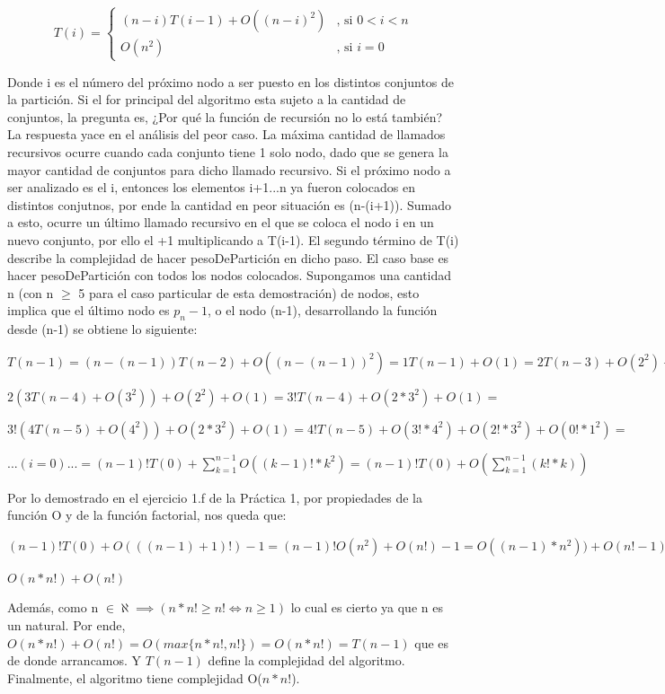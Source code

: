 \[ T(i) = \left\{ \begin{array}{ll}
         (n-i)T(i-1) + O((n-i)^2) & \mbox{, si $0 < i < n$}\\
         O(n^2) & \mbox{, si $i = 0$}\end{array} \right. \]

Donde i es el número del próximo nodo a ser puesto en los distintos conjuntos de la partición. Si el for principal del algoritmo esta sujeto a la cantidad de conjuntos, la pregunta es, ¿Por qué la función de recursión no lo está también? La respuesta yace en el análisis del peor caso. La máxima cantidad de llamados recursivos ocurre cuando cada conjunto tiene 1 solo nodo, dado que se genera la mayor cantidad de conjuntos para dicho llamado recursivo. Si el próximo nodo a ser analizado es el i, entonces los elementos i+1...n ya fueron colocados en distintos conjutnos, por ende la cantidad en peor situación es (n-(i+1)). Sumado a esto, ocurre un último llamado recursivo en el que se coloca el nodo i en un nuevo conjunto, por ello el +1 multiplicando a T(i-1). El segundo término de T(i) describe la complejidad de hacer pesoDePartición en dicho paso. El caso base es hacer pesoDePartición con todos los nodos colocados.\newline
\indent Supongamos una cantidad n (con n $\geq$ 5 para el caso particular de esta demostración) de nodos, esto implica que el último nodo es $p_n-1$, o el nodo (n-1), desarrollando la función desde (n-1) se obtiene lo siguiente:

$T(n-1) = (n-(n-1))T(n-2) + O((n-(n-1))^2) = 1T(n-1) + O(1) = 2T(n-3) + O(2^2) + O(1) = $

$2(3T(n-4) + O(3^2)) + O(2^2) + O(1) = 3!T(n-4) + O(2*3^2) + O(1) = $

$3!(4T(n-5) + O(4^2)) + O(2*3^2) + O(1) = 4!T(n-5) + O(3!*4^2) + O(2!*3^2) + O(0!*1^2) =$

$...(i = 0)... = (n-1)!T(0) + \sum\limits_{k=1}^{n-1} O((k-1)!*k^2) = (n-1)!T(0) + O(\sum\limits_{k=1}^{n-1} (k!*k))$

Por lo demostrado en el ejercicio 1.f de la Práctica 1, por propiedades de la función O y de la función factorial, nos queda que:

$(n-1)!T(0) + O(((n-1)+1)!) - 1 = (n-1)!O(n^2) + O(n!) - 1 = O((n-1)*n^2)) + O(n! - 1) =$

$O(n*n!) + O(n!)$

Además, como n $\in \aleph \implies ( n*n! \geq n! \iff n \geq 1)$ lo cual es cierto ya que n es un natural.
Por ende, $O(n*n!) + O(n!) = O(max\{n*n!,n!\}) = O(n*n!) = T(n-1)$ que es de donde arrancamos. Y $T(n-1)$ define la complejidad del algoritmo. Finalmente, el algoritmo tiene complejidad O($n*n!$).


